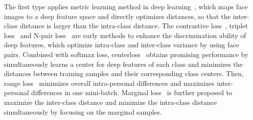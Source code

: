 \documentclass[journal,comsoc]{IEEEtran}
\begin{document}
The first type applies metric learning method in deep learning~\cite{Sun2014Deep,Schroff2015FaceNet,Wen2016A}, which maps face images to a deep feature space and directly optimizes distances, so that the inter-class distance is larger than the intra-class distance. The contrastive loss~\cite{Sun2014Deep}, triplet loss~\cite{Schroff2015FaceNet} and N-pair loss~\cite{sohn2016improved} are early methods to enhance the discrimination ability of deep features, which optimize intra-class and inter-class variance by using face pairs. Combined with softmax loss, centerloss~\cite{Wen2016A} obtains promising performance by simultaneously learns a center for deep features of each class and minimizes the distances between training samples and their corresponding
class centers. Then, range loss~\cite{Zhang2017rangeloss} minimizes overall intra-personal differences and maximizes inter-personal differences in one mini-batch. Marginal loss~\cite{Deng2017Marginal} is further proposed to maximize the inter-class distance and minimize the intra-class distance simultaneously by focusing on the marginal samples. 
\end{document}
